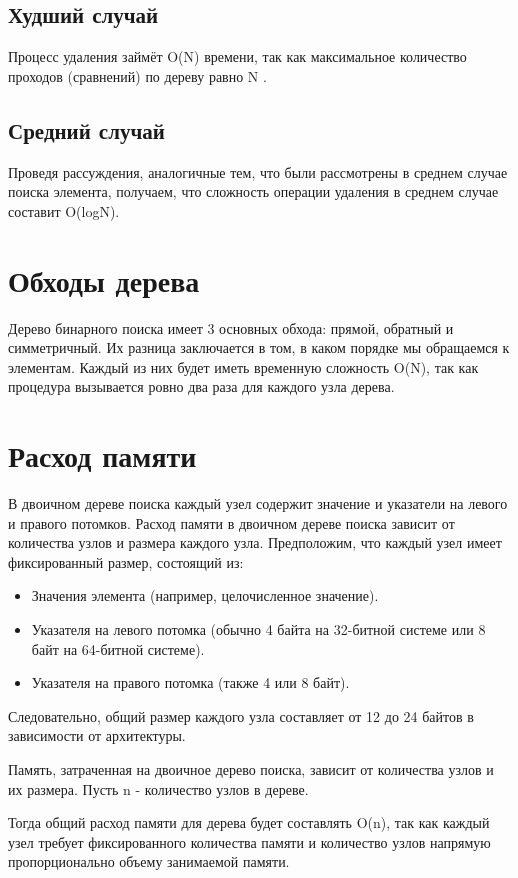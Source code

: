 \documentclass[otchet]{SCWorks}
\begin{document}
\subsection{Худший случай}
Процесс удаления займёт O(N) времени, так как максимальное количество проходов (сравнений) по дереву равно N .

\subsection{Средний случай}
Проведя рассуждения, аналогичные тем, что были рассмотрены в среднем случае поиска элемента, получаем, что сложность операции удаления в среднем случае составит O(logN).

\section{Обходы дерева}
Дерево бинарного поиска имеет 3 основных обхода: прямой, обратный и симметричный. Их разница заключается в том, в каком порядке мы обращаемся к элементам. Каждый из них будет иметь временную сложность O(N), так как процедура вызывается ровно два раза для каждого узла дерева.

\section{Расход памяти}
В двоичном дереве поиска каждый узел содержит значение и указатели на левого и правого потомков. Расход памяти в двоичном дереве поиска зависит от количества узлов и размера каждого узла.
Предположим, что каждый узел имеет фиксированный размер, состоящий из:

\begin{itemize}
    \item Значения элемента (например, целочисленное значение).
    
    \item Указателя на левого потомка (обычно 4 байта на 32-битной системе или 8 байт на 64-битной системе).
    
    \item Указателя на правого потомка (также 4 или 8 байт).
\end{itemize}

Следовательно, общий размер каждого узла составляет от 12 до 24 байтов в зависимости от архитектуры.

Память, затраченная на двоичное дерево поиска, зависит от количества узлов и их размера. Пусть n - количество узлов в дереве.

Тогда общий расход памяти для дерева будет составлять O(n), так как
каждый узел требует фиксированного количества памяти и количество узлов напрямую пропорционально объему занимаемой памяти.



	


\appendix
\end{document}
